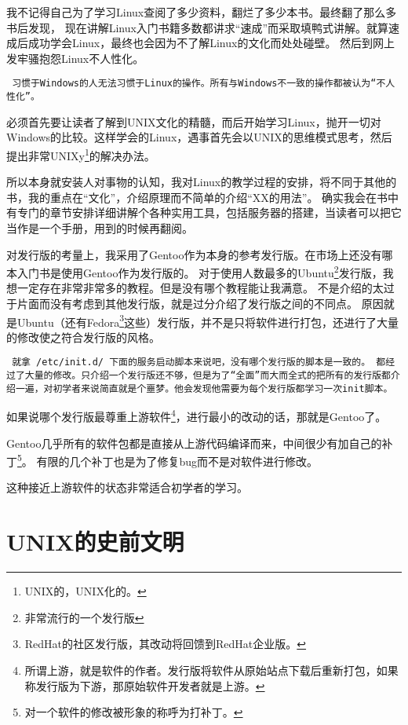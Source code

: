 \documentclass[amstex]{ctexbook}
\newenvironment{notice}{\tt}{}
\begin{document}
我不记得自己为了学习Linux查阅了多少资料，翻烂了多少本书。最终翻了那么多书后发现，
现在讲解Linux入门书籍多数都讲求“速成”而采取填鸭式讲解。就算速成后成功学会Linux，最终也会因为不了解Linux的文化而处处碰壁。
然后到网上发牢骚抱怨Linux不人性化。

\begin{notice}
习惯于Windows的人无法习惯于Linux的操作。所有与Windows不一致的操作都被认为“不人性化”。
\end{notice}

必须首先要让读者了解到UNIX文化的精髓，而后开始学习Linux，抛开一切对Windows的比较。这样学会的Linux，遇事首先会以UNIX的思维模式思考，然后提出非常UNIXy\footnote{UNIX的，UNIX化的。}的解决办法。

所以本身就安装人对事物的认知，我对Linux的教学过程的安排，将不同于其他的书，我的重点在“文化”，介绍原理而不简单的介绍“XX的用法”。
确实我会在书中有专门的章节安排详细讲解个各种实用工具，包括服务器的搭建，当读者可以把它当作是一个手册，用到的时候再翻阅。

对发行版的考量上，我采用了Gentoo作为本身的参考发行版。在市场上还没有哪本入门书是使用Gentoo作为发行版的。
对于使用人数最多的Ubuntu\footnote{非常流行的一个发行版}发行版，我想一定存在非常非常多的教程。但是没有哪个教程能让我满意。
不是介绍的太过于片面而没有考虑到其他发行版，就是过分介绍了发行版之间的不同点。
原因就是Ubuntu（还有Fedora\footnote{RedHat的社区发行版，其改动将回馈到RedHat企业版。}这些）发行版，并不是只将软件进行打包，还进行了大量的修改使之符合发行版的风格。

\begin{notice}
就拿 /etc/init.d/ 下面的服务启动脚本来说吧，没有哪个发行版的脚本是一致的。
都经过了大量的修改。只介绍一个发行版还不够，但是为了“全面”而大而全式的把所有的发行版都介绍一遍，对初学者来说简直就是个噩梦。他会发现他需要为每个发行版都学习一次init脚本。
\end{notice}

如果说哪个发行版最尊重上游软件\footnote{所谓上游，就是软件的作者。发行版将软件从原始站点下载后重新打包，如果称发行版为下游，那原始软件开发者就是上游。}，进行最小的改动的话，那就是Gentoo了。

Gentoo几乎所有的软件包都是直接从上游代码编译而来，中间很少有加自己的补丁\footnote{对一个软件的修改被形象的称呼为打补丁。}。
有限的几个补丁也是为了修复bug而不是对软件进行修改。

这种接近上游软件的状态非常适合初学者的学习。

\section{UNIX的史前文明}
\end{document}
